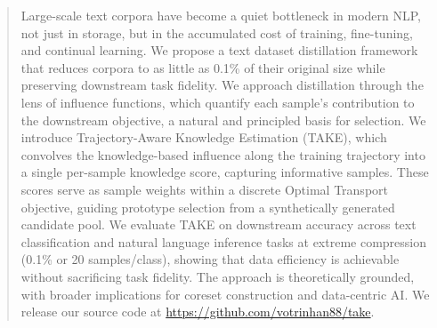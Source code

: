 \begin{abstract} \label{sec:00-abstract}
  Large-scale text corpora have become a quiet bottleneck in modern NLP, not just in storage, but in the accumulated cost of training, fine-tuning, and continual learning.
  We propose a text dataset distillation framework that reduces corpora to as little as 0.1\% of their original size while preserving downstream task fidelity.
  We approach distillation through the lens of influence functions, which quantify each sample's contribution to the downstream objective, a natural and principled basis for selection.
  We introduce Trajectory-Aware Knowledge Estimation (TAKE), which convolves the knowledge-based influence along the training trajectory into a single per-sample knowledge score, capturing informative samples.
  These scores serve as sample weights within a discrete Optimal Transport objective, guiding prototype selection from a synthetically generated candidate pool.
  We evaluate TAKE on downstream accuracy across text classification and natural language inference tasks at extreme compression (0.1\% or 20 samples/class), showing that data efficiency is achievable without sacrificing task fidelity.
  The approach is theoretically grounded, with broader implications for coreset construction and data-centric AI.
  We release our source code at \url{https://github.com/votrinhan88/take}.

\end{abstract}

